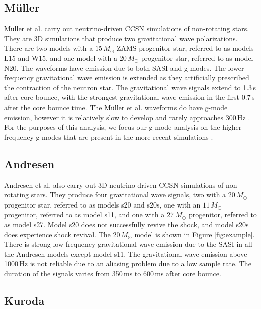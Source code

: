 \documentclass[letterpaper, aps, prd, twocolumn, superscriptaddress, showpacs, nofootinbib]{revtex4}
\begin{document}
\subsection{M\"uller}

M\"uller et al. \cite{mueller:e12} carry out neutrino-driven CCSN simulations of non-rotating stars. They are 3D simulations that produce two gravitational wave polarizations. There are two models with a $15\,M_{\odot}$ ZAMS progenitor star, referred to as models L15 and W15, and one model with a $20\,M_{\odot}$ progenitor star, referred to as model N20. The waveforms have emission due to both SASI and g-modes. The lower frequency gravitational wave emission is extended as they artificially prescribed the contraction of the neutron star. The gravitational wave signals extend to 1.3\,s after core bounce, with the strongest gravitational wave emission in the first 0.7\,s after the core bounce time. The M\"uller et al. waveforms do have g-mode emission, however it is relatively slow to develop and rarely approaches 300\,Hz \cite{mueller:e12}. For the purposes of this analysis, we focus our g-mode analysis on the higher frequency g-modes that are present in the more recent simulations \cite{andresen:16, kuroda:16}.  

\subsection{Andresen}

Andresen et al. \cite{andresen:16} also carry out 3D neutrino-driven CCSN simulations of non-rotating stars. They produce four gravitational wave signals, two with a $20\,M_{\odot}$ progenitor star, referred to as models s20 and s20s, one with an $11\,M_{\odot}$ progenitor, referred to as model s11, and one with a $27\,M_{\odot}$ progenitor, referred to as model s27. Model s20 does not successfully revive the shock, and model s20s does experience shock revival. The $20\,M_{\odot}$ model is shown in Figure \ref{fig:example}. There is strong low frequency gravitational wave emission due to the SASI in all the Andresen models except model s11. The gravitational wave emission above 1000\,Hz is not reliable due to an aliasing problem due to a low sample rate. The duration of the signals varies from 350\,ms to 600\,ms after core bounce. 

\subsection{Kuroda}
\end{document}
